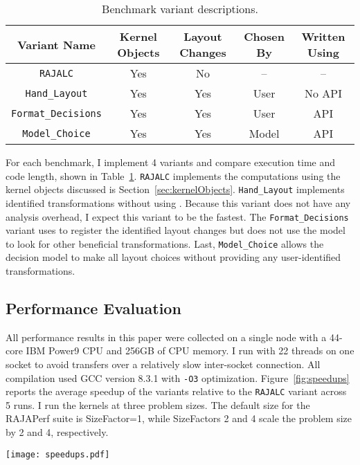 \begin{table}
	\centering
	\begin{tabular}{|c|c|c|c|c|}
		\hline
		Variant Name & Kernel Objects & Layout Changes & Chosen By & Written Using \\
		\hline
		\verb.RAJALC. & Yes & No & -- & -- \\
		\verb.Hand_Layout. & Yes & Yes & User & No API \\
		\verb.Format_Decisions. & Yes & Yes & User & API \\
		\verb.Model_Choice. & Yes & Yes & Model & API \\
		\hline
	\end{tabular}
	\caption{Benchmark variant descriptions.}\label{VariantDescription}
\end{table}
For each benchmark, I implement 4 variants and compare execution time and code length, shown in Table~\ref{VariantDescription}.
\verb.RAJALC. implements the computations using the kernel objects discussed is Section~\ref{sec:kernelObjects}. 
\verb.Hand_Layout. implements identified transformations without using \FormatDecisions. 
Because this variant does not have any analysis overhead, I expect this variant to be the fastest.
The \verb.Format_Decisions. variant uses \FormatDecisions to register the identified layout changes but does not use the model to look for other beneficial transformations.
Last, \verb.Model_Choice. allows the decision model to make all layout choices without providing any user-identified transformations.

\subsection{Performance Evaluation}\label{sec:systemDetails}
All performance results in this paper were collected on a single node with a 44-core IBM Power9 CPU and 256GB of CPU memory. 
I run with 22 threads on one socket to avoid transfers over a relatively slow inter-socket connection.
All compilation used GCC version 8.3.1 with \verb.-O3. optimization.
Figure~\ref{fig:speedups} reports the average speedup of the variants relative to the \verb.RAJALC. variant across 5 runs. 
I run the kernels at three problem sizes.
The default size for the RAJAPerf suite is SizeFactor=1, while SizeFactors 2 and 4 scale the problem size by 2 and 4, respectively.

\begin{figure*}
	\texttt{[image: speedups.pdf]}
	\caption{Relative speedups of the different variants for different problem size factors. Speedup is calculated in reference to the RAJALC variant. Higher is better.}\label{fig:speedups}
\end{figure*}

